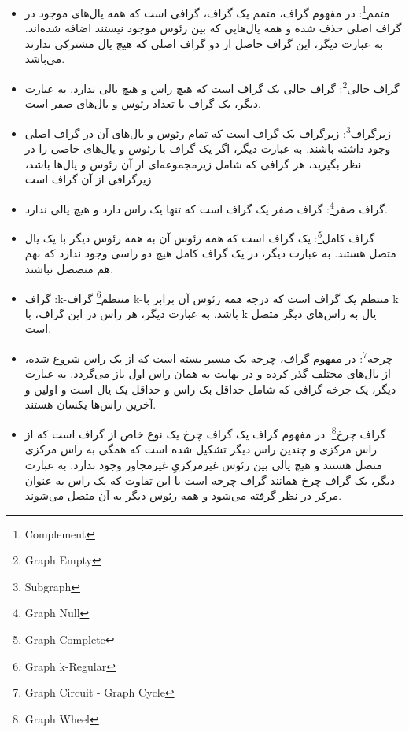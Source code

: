 \documentclass[a4paper,10pt]{article}
\begin{document}
\begin{itemize}
        \item متمم\footnote{\hspace{2pt}Complement}: در مفهوم گراف، متمم یک گراف، گرافی است که همه یال‌های موجود در گراف اصلی حذف شده و همه یال‌هایی که بین رئوس موجود نیستند اضافه شده‌اند. به عبارت دیگر، این گراف حاصل از دو گراف اصلی که هیچ یال مشترکی ندارند می‌باشد.

        \item گراف خالی\footnote{\hspace{2pt}Graph Empty}: گراف  خالی یک گراف است که هیچ راس و هیچ یالی ندارد. به عبارت دیگر، یک گراف با تعداد رئوس و یال‌های صفر است.

        \item زیرگراف\footnote{\hspace{2pt}Subgraph}: زیرگراف یک گراف است که تمام رئوس و یال‌های آن در گراف اصلی وجود داشته باشند. به عبارت دیگر، اگر یک گراف با رئوس و یال‌های خاصی را در نظر بگیرید، هر گرافی که شامل زیرمجموعه‌ای ار آن رئوس و یال‌ها باشد، زیرگرافی از آن گراف است.
        
        \item گراف صفر\footnote{\hspace{2pt}Graph Null}: گراف صفر یک گراف است که تنها یک راس دارد و هیچ یالی ندارد.

        \item گراف کامل\footnote{\hspace{2pt}Graph Complete}: یک گراف است که همه رئوس آن به همه رئوس دیگر با یک یال متصل هستند. به عبارت دیگر، در یک گراف کامل هیچ دو راسی وجود ندارد که بهم هم متصصل نباشند.

        \item گراف :k-منتظم\footnote{\hspace{2pt}Graph k-Regular} گراف k-منتظم یک گراف است که درجه همه رئوس آن برابر با k باشد. به عبارت دیگر، هر راس در این گراف، با k یال به راس‌های دیگر متصل است.

        \item چرخه\footnote{\hspace{2pt}Graph Circuit - Graph Cycle}: در مفهوم گراف، چرخه یک مسیر بسته است که از یک راس شروع شده، از یال‌های مختلف گذر کرده و در نهایت به همان راس اول باز می‌گردد. به عبارت دیگر، یک چرخه گرافی که شامل حداقل بک راس و حداقل یک یال است و اولین و آخرین راس‌ها یکسان هستند.
        
        \item گراف چرخ\footnote{\hspace{2pt}Graph Wheel}: در مفهوم گراف یک گراف چرخ یک نوع خاص از گراف است که از راس مرکزی و چندین راس دیگر تشکیل شده است که همگی به راس مرکزی متصل هستند و هیچ یالی بین رئوس غیرمرکزیِ غیرمجاور وجود ندارد. به عبارت دیگر، یک گراف چرخ همانند گراف چرخه است با این تفاوت که یک راس به عنوان مرکز در نظر گرفته می‌شود و همه رئوس دیگر به آن متصل می‌شوند.
        

\end{itemize}
\end{document}

